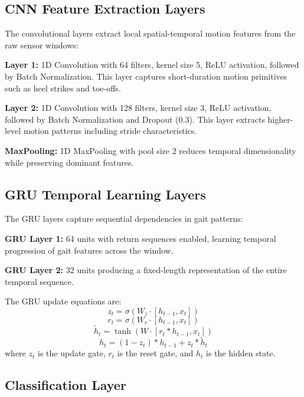 \documentclass[conference]{IEEEtran}
\begin{document}
\subsection{CNN Feature Extraction Layers}

The convolutional layers extract local spatial-temporal motion features from the raw sensor windows:

\textbf{Layer 1:} 1D Convolution with 64 filters, kernel size 5, ReLU activation, followed by Batch Normalization. This layer captures short-duration motion primitives such as heel strikes and toe-offs.

\textbf{Layer 2:} 1D Convolution with 128 filters, kernel size 3, ReLU activation, followed by Batch Normalization and Dropout (0.3). This layer extracts higher-level motion patterns including stride characteristics.

\textbf{MaxPooling:} 1D MaxPooling with pool size 2 reduces temporal dimensionality while preserving dominant features.

\subsection{GRU Temporal Learning Layers}

The GRU layers capture sequential dependencies in gait patterns:

\textbf{GRU Layer 1:} 64 units with return sequences enabled, learning temporal progression of gait features across the window.

\textbf{GRU Layer 2:} 32 units producing a fixed-length representation of the entire temporal sequence.

The GRU update equations are:
\begin{equation}
    z_t = \sigma(W_z \cdot [h_{t-1}, x_t])
\end{equation}
\begin{equation}
    r_t = \sigma(W_r \cdot [h_{t-1}, x_t])
\end{equation}
\begin{equation}
    \tilde{h}_t = \tanh(W \cdot [r_t * h_{t-1}, x_t])
\end{equation}
\begin{equation}
    h_t = (1 - z_t) * h_{t-1} + z_t * \tilde{h}_t
\end{equation}
where $z_t$ is the update gate, $r_t$ is the reset gate, and $h_t$ is the hidden state.

\subsection{Classification Layer}
\end{document}
